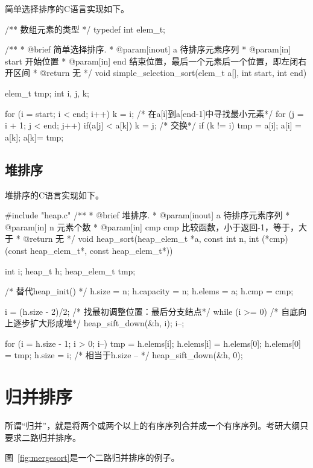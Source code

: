 简单选择排序的C语言实现如下。
\begin{Codex}[label=simple_selection_sort.c]
/** 数组元素的类型 */
typedef int elem_t;

/**
  * @brief 简单选择排序.
  * @param[inout] a 待排序元素序列
  * @param[in] start 开始位置
  * @param[in] end 结束位置，最后一个元素后一个位置，即左闭右开区间
  * @return 无
  */
void simple_selection_sort(elem_t a[], int start, int end) {
    elem_t tmp;
    int i, j, k;

    for (i = start; i < end; i++) {
        k = i;
        /* 在a[i]到a[end-1]中寻找最小元素*/
        for (j = i + 1; j < end; j++)
            if(a[j] < a[k]) k = j;
        /* 交换*/
        if (k != i) {
            tmp = a[i];
            a[i] = a[k];
            a[k]= tmp;
        }
    }
}
\end{Codex}


\subsection{堆排序}
堆排序的C语言实现如下。
\begin{Codex}[label=heap_sort.c]
#include "heap.c"
/**
  * @brief 堆排序.
  * @param[inout] a 待排序元素序列
  * @param[in] n 元素个数
  * @param[in] cmp cmp 比较函数，小于返回-1，等于，大于
  * @return 无
  */
void heap_sort(heap_elem_t *a, const int n, 
               int (*cmp)(const heap_elem_t*, const heap_elem_t*)) {
    int i;
    heap_t h;
    heap_elem_t tmp;

    /* 替代heap_init() */
    h.size = n;
    h.capacity = n;
    h.elems = a;
    h.cmp = cmp;

    i = (h.size - 2)/2;   /* 找最初调整位置：最后分支结点*/
    while (i >= 0) {  /* 自底向上逐步扩大形成堆*/
        heap_sift_down(&h, i);
        i--;
    }

    for (i = h.size - 1; i > 0; i--) {
        tmp = h.elems[i];
        h.elems[i] = h.elems[0];
        h.elems[0] = tmp;
        h.size = i; /* 相当于h.size -- */
        heap_sift_down(&h, 0);
    }
}
\end{Codex}


\section{归并排序} %
所谓“归并”，就是将两个或两个以上的有序序列合并成一个有序序列。考研大纲只要求二路归并排序。

图~\ref{fig:mergesort}是一个二路归并排序的例子。

